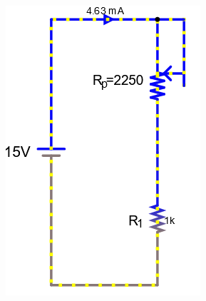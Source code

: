 \documentclass[a4paper]{article}
\begin{document}
\begin{figure}[H]
\begin{subfigure}{0.333\textwidth}
        \includegraphics[width=.9\linewidth]{pot9}
    \end{subfigure}
    \hspace{.15\textwidth}
    \begin{subfigure}{0.333\textwidth}

\end{subfigure}
\end{figure}
\end{document}
